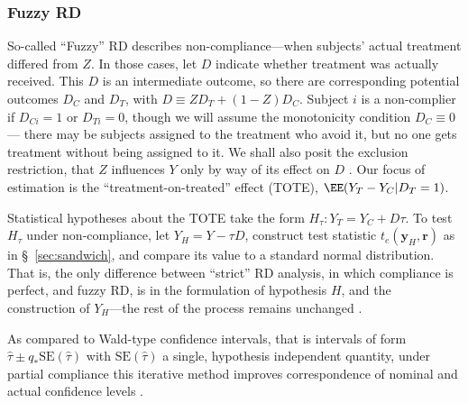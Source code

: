 
\subsubsection{Fuzzy RD}
So-called ``Fuzzy'' RD describes non-compliance---when subjects' actual
treatment differed from $Z$.
In those cases, let $D$ indicate whether treatment was actually
received.
This $D$ is an intermediate outcome, so there are
corresponding potential outcomes $D_{C}$ and $D_{T}$, with $D \equiv ZD_{T}
+ (1-Z)D_{C}$.
Subject $i$ is a non-complier if $D_{Ci}=1$ or $D_{Ti}=0$, though we
will assume the monotonicity condition $D_{C}\equiv 0$ --- there may be
subjects assigned to the treatment who avoid it, but no one gets
treatment without being assigned to it.
We shall also posit the exclusion restriction,
that $Z$ influences $Y$ only by way of its effect on $D$
\citep{bloom1984ans,Angrist:etal:1996,imbens:rose:2005}.
Our focus of estimation is the
 ``treatment-on-treated'' effect (TOTE),
$\EE(Y_{T} - Y_{C}| D_{T}=1)$.

Statistical hypotheses about the TOTE take the form
$H_\tau:Y_T=Y_C+D\tau$.
To test $H_\tau$ under non-compliance, let $Y_H=Y-\tau D$,
construct test statistic $t_{e} (\mathbf{y}_H,\mathbf{r})$ as in
\S~\ref{sec:sandwich}, and compare its value to a standard normal
distribution.
That is, the only difference between ``strict'' RD analysis, in which
compliance is perfect, and fuzzy RD, is in the formulation of
hypothesis $H$, and the construction of $Y_H$---the rest of the
process remains unchanged \citep{rosenbaum:1996:onAIR}.

As compared to Wald-type
confidence intervals, that is intervals of form $\hat\tau \pm q_{*}
\mathrm{SE}(\hat\tau)$ with $\mathrm{SE}(\hat\tau)$ a single,
hypothesis independent quantity, under partial compliance this iterative method
improves correspondence of nominal and actual confidence levels
\citep[Sec.~7]{imbens:rose:2005,baiocchiChengSmall2014IVtutorial}.

